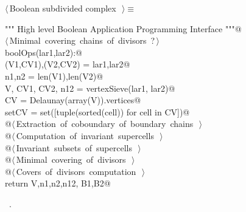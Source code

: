 \documentclass[11pt,oneside]{article}	%
\begin{document}
\begin{flushleft} \small \label{scrap16}
$\langle\,$Boolean subdivided complex\nobreak\ {\footnotesize {}}$\,\rangle\equiv$
\vspace{-1ex}
\begin{list}{}{} \item
\mbox{}\verb@""" High level Boolean Application Programming Interface """@\\
\mbox{}\verb@@\hbox{$\langle\,$Minimal covering chains of divisors\nobreak\ {\footnotesize ?}$\,\rangle$}\verb@@\\
\mbox{}\verb@def boolOps(lar1,lar2):@\\
\mbox{}\verb@   (V1,CV1),(V2,CV2) = lar1,lar2@\\
\mbox{}\verb@   n1,n2 = len(V1),len(V2)@\\
\mbox{}\verb@   V, CV1, CV2, n12 = vertexSieve(lar1, lar2)@\\
\mbox{}\verb@   CV = Delaunay(array(V)).vertices@\\
\mbox{}\verb@   setCV = set([tuple(sorted(cell)) for cell in CV])@\\
\mbox{}\verb@   @\hbox{$\langle\,$Extraction of coboundary of boundary chains\nobreak\ {\footnotesize {}}$\,\rangle$}\verb@@\\
\mbox{}\verb@   @\hbox{$\langle\,$Computation of invariant supercells\nobreak\ {\footnotesize {}}$\,\rangle$}\verb@@\\
\mbox{}\verb@   @\hbox{$\langle\,$Invariant subsets of supercells\nobreak\ {\footnotesize {}}$\,\rangle$}\verb@@\\
\mbox{}\verb@   @\hbox{$\langle\,$Minimal covering of divisors\nobreak\ {\footnotesize {}}$\,\rangle$}\verb@@\\
\mbox{}\verb@   @\hbox{$\langle\,$Covers of divisors computation\nobreak\ {\footnotesize {}}$\,\rangle$}\verb@@\\
\mbox{}\verb@   return V,n1,n2,n12, B1,B2@\\
\mbox{}\verb@@{\NWsep}
\end{list}
\vspace{-1ex}
\footnotesize\addtolength{\baselineskip}{-1ex}
\begin{list}{}{\setlength{\itemsep}{-\parsep}\setlength{\itemindent}{-\leftmargin}}
\item \NWtxtMacroRefIn\ .
\end{list}
\end{flushleft}
\end{document}

